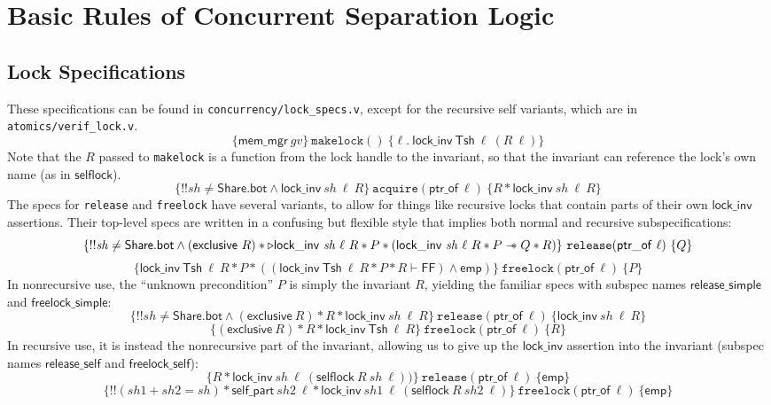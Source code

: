 \documentclass[11pt]{article}
\begin{document}
\section{Basic Rules of Concurrent Separation Logic}
\label{CSL}
\subsection{Lock Specifications}
\label{lock-specs}
These specifications can be found in \texttt{concurrency/lock\_specs.v}, except for the recursive \textsf{self} variants, which are in \texttt{atomics/verif\_lock.v}.
$$\{\mathsf{mem\_mgr}\ \mathit{gv}\}\ \texttt{makelock}()\ \{\ell.\ \mathsf{lock\_inv}\ \mathsf{Tsh}\ \ell\ (R\ \ell)\}$$
Note that the $R$ passed to \texttt{makelock} is a function from the lock handle to the invariant, so that the invariant can reference the lock's own name (as in $\mathsf{selflock}$).
$$\{!!\mathit{sh} \neq \mathsf{Share.bot} \land \mathsf{lock\_inv}\ \mathit{sh}\ \ell\ R\}\ \texttt{acquire}(\mathsf{ptr\_of}\ \ell)\ \{R * \mathsf{lock\_inv}\ \mathit{sh}\ \ell\ R\}$$
The specs for \texttt{release} and \texttt{freelock} have several variants, to allow for things like recursive locks that contain parts of their own $\mathsf{lock\_inv}$ assertions. Their top-level specs are written in a confusing but flexible style that implies both normal and recursive subspecifications:
$$\{!!\mathit{sh} \neq \mathsf{Share.bot} \land (\mathsf{exclusive}\ R) * \triangleright \mathsf{lock\_inv}\ \mathit{sh}\ \ell\ R * P * (\mathsf{lock\_inv}\ \mathit{sh}\ \ell\ R * P \wand Q * R)\}\ \texttt{release}(\mathsf{ptr\_of}\ \ell)\ \{Q\}$$
$$\{\mathsf{lock\_inv}\ \mathsf{Tsh}\ \ell\ R * P * ((\mathsf{lock\_inv}\ \mathsf{Tsh}\ \ell\ R * P * R \vdash \mathsf{FF}) \land \mathsf{emp})\}\ \texttt{freelock}(\mathsf{ptr\_of}\ \ell)\ \{P\}$$
In nonrecursive use, the ``unknown precondition'' $P$ is simply the invariant $R$, yielding the familiar specs with subspec names $\mathsf{release\_simple}$ and $\mathsf{freelock\_simple}$:
$$\{!!\mathit{sh} \neq \mathsf{Share.bot} \land (\mathsf{exclusive}\ R) * R * \mathsf{lock\_inv}\ \mathit{sh}\ \ell\ R\}\ \texttt{release}(\mathsf{ptr\_of}\ \ell)\ \{\mathsf{lock\_inv}\ \mathit{sh}\ \ell\ R\}$$
$$\{(\mathsf{exclusive}\ R) * R * \mathsf{lock\_inv}\ \mathsf{Tsh}\ \ell\ R\}\ \texttt{freelock}(\mathsf{ptr\_of}\ \ell)\ \{R\}$$
In recursive use, it is instead the nonrecursive part of the invariant, allowing us to give up the $\mathsf{lock\_inv}$ assertion into the invariant (subspec names $\mathsf{release\_self}$ and $\mathsf{freelock\_self}$):
$$\{R * \mathsf{lock\_inv}\ \mathit{sh}\ \ell\ (\mathsf{selflock}\ R\ \mathit{sh}\ \ell))\}\ \texttt{release}(\mathsf{ptr\_of}\ \ell)\ \{\mathsf{emp}\}$$
$$\{!!(\mathit{sh1} + \mathit{sh2} = \mathit{sh}) * \mathsf{self\_part}\ \mathit{sh2}\ \ell * \mathsf{lock\_inv}\ \mathit{sh1}\ \ell\ (\mathsf{selflock}\ R\ \mathit{sh2}\ \ell)\}\ \texttt{freelock}(\mathsf{ptr\_of}\ \ell)\ \{\mathsf{emp}\}$$
 
\end{document}
